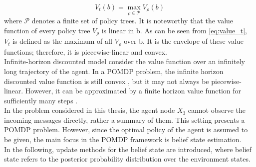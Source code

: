 \begin{equation}
V_{t}(b)=\max _{\rho \in \mathcal{P}} V_\rho(b)
\label{eq:value_t}
\end{equation}
where $ \mathcal{P} $ denotes a finite set of policy trees.
It is noteworthy that the value function of every policy tree $ V_\rho $ is linear in b. As can be seen from \autoref{eq:value_t}, $ V_t $ is defined as the maximum of all $ V_\rho $ over b. It is the envelope of these value functions; therefore, it is piecewise-linear and convex.\\
Infinite-horizon discounted model consider the value function over an infinitely long trajectory of the agent. In a POMDP problem, the infinite horizon discounted value function is still convex \cite{White1980}, but it may not always be piecewise-linear. However, it can be approximated by a finite horizon value function for sufficiently many steps \cite{Sawaki1978, Edward2019}.\\
In the problem considered in this thesis, the agent node $ X_{3} $ cannot observe the incoming messages directly, rather a summary of them. This setting presents a POMDP problem. However, since the optimal policy of the agent is assumed to be given, the main focus in the POMDP framework is belief state estimation. \\
In the following, update methods for the belief state are introduced, where belief state refers to the posterior probability distribution over the environment states.

